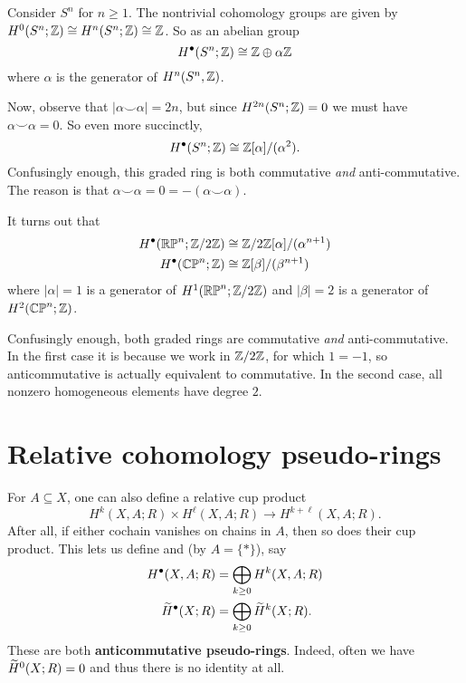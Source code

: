 \begin{example}
	Consider $S^n$ for $n \ge 1$.
	The nontrivial cohomology groups are given by
	$H^0(S^n; \mathbb Z) \cong H^n(S^n; \mathbb Z) \cong \mathbb Z$.
	So as an abelian group
	\[ H^\bullet(S^n; \mathbb Z) \cong \mathbb Z \oplus \alpha \mathbb Z \]
	where $\alpha$ is the generator of $H^n(S^n, \mathbb Z)$.
	
	Now, observe that $|\alpha\smile\alpha| = 2n$, but
	since $H^{2n}(S^n; \mathbb Z) = 0$ we must have $\alpha\smile\alpha=0$.
	So even more succinctly,
	\[ H^\bullet(S^n; \mathbb Z) \cong \mathbb Z[\alpha]/(\alpha^2). \]
	Confusingly enough, this graded ring is both
	commutative \emph{and} anti-commutative.
	The reason is that $\alpha \smile \alpha = 0 = -(\alpha \smile \alpha)$.
\end{example}

\begin{example}
	It turns out that
	\begin{align*}
		H^\bullet(\mathbb{RP}^n; \mathbb Z/2\mathbb Z) &\cong \mathbb Z/2\mathbb Z[\alpha]/(\alpha^{n+1}) \\
		H^\bullet(\mathbb{CP}^n; \mathbb Z) &\cong \mathbb Z[\beta]/(\beta^{n+1})
	\end{align*}
	where $|\alpha| = 1$ is a generator of $H^1(\mathbb{RP}^n; \mathbb Z/2\mathbb Z)$
	and $|\beta| = 2$ is a generator of $H^2(\mathbb{CP}^n; \mathbb Z)$.

	Confusingly enough, both graded rings are commutative \emph{and} anti-commutative.
	In the first case it is because we work in $\mathbb Z/2\mathbb Z$, for which $1 = -1$,
	so anticommutative is actually equivalent to commutative.
	In the second case, all nonzero homogeneous elements have degree $2$.
\end{example}


\section{Relative cohomology pseudo-rings}
For $A \subseteq X$, one can also define a relative cup product
\[ H^k(X,A;R) \times H^\ell(X,A;R) \to H^{k+\ell}(X,A;R). \]
After all, if either cochain vanishes on chains in $A$,
then so does their cup product.
This lets us define 
and  (by $A = \{\ast\}$), say
\begin{align*}
H^\bullet(X,A;R) &= \bigoplus_{k \ge 0} H^k(X,A; R) \\
\widetilde H^\bullet(X;R) &= \bigoplus_{k \ge 0} \widetilde H^k(X;R).
\end{align*}
These are both \textbf{anticommutative pseudo-rings}.
Indeed, often we have $\widetilde H^0(X;R) = 0$ and thus there is no identity at all.

